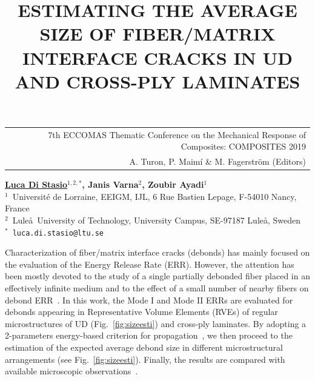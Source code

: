 \documentclass[12pt,a4paper]{article}
\begin{document}
\thispagestyle{empty}

\vspace*{-3.4cm}
\begin{table}[!h]
\begin{tabular}{r}
\hspace*{2.9cm} \scriptsize \textsf{7th ECCOMAS Thematic Conference on the Mechanical Response of Composites: COMPOSITES 2019} \\
\hspace*{2.9cm} \tiny \textsf{A. Turon, P. Maimí \& M. Fagerström (Editors)}
\end{tabular}
\end{table}

\vspace*{-0.7cm}

\begin{center}
\title{ESTIMATING THE AVERAGE SIZE OF FIBER/MATRIX INTERFACE CRACKS IN UD AND CROSS-PLY LAMINATES}
\end{center}
\begin{center}
\textbf{\underline{Luca Di Stasio}$^{1,2,*}$, Janis Varna$^{2}$, Zoubir Ayadi$^{1}$} \\ [7pt]
\small{$^1$~Universit\'e de Lorraine, EEIGM, IJL, 6 Rue Bastien Lepage, F-54010 Nancy, France}  \\  [2pt]
\small{$^2$~Lule\aa\ University of Technology, University Campus, SE-97187 Lule\aa, Sweden}  \\  [2pt]
\small{$^*$~\texttt{luca.di.stasio@ltu.se}} \\
\end{center}

\noindent
Characterization of fiber/matrix interface cracks (debonds) has mainly focused on the evaluation of the Energy Release Rate (ERR). However, the attention has been mostly devoted to the study of a single partially debonded fiber placed in an effectively infinite medium and to the effect of a small number of nearby fibers on debond ERR~\cite{Sandino2016}. In this work, the Mode I and Mode II ERRs are evaluated for debonds appearing in Representative Volume Elements (RVEs) of regular microstructures of UD (Fig.~\ref{fig:sizeesti}) and cross-ply laminates. By adopting a 2-parameters energy-based criterion for propagation~\cite{Hutchinson1992}, we then proceed to the estimation of the expected average debond size in different microstructural arrangements (see Fig.~\ref{fig:sizeesti}). Finally, the results are compared with available microscopic observations~\cite{Correa2018}.
\end{document}
